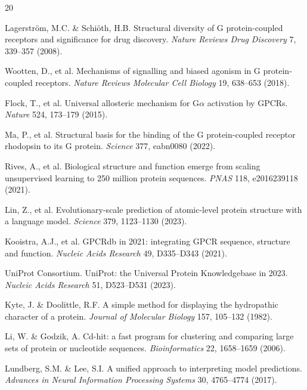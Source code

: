 \documentclass[11pt,a4paper]{article}
\begin{document}

\begin{thebibliography}{20}

Lagerstr\"om, M.C. \& Schi\"oth, H.B.
Structural diversity of G protein-coupled receptors and significance for drug discovery.
\textit{Nature Reviews Drug Discovery} 7, 339--357 (2008).

Wootten, D., et al.
Mechanisms of signalling and biased agonism in G protein-coupled receptors.
\textit{Nature Reviews Molecular Cell Biology} 19, 638--653 (2018).

Flock, T., et al.
Universal allosteric mechanism for G$\alpha$ activation by GPCRs.
\textit{Nature} 524, 173--179 (2015).

Ma, P., et al.
Structural basis for the binding of the G protein-coupled receptor rhodopsin to its G protein.
\textit{Science} 377, eabn0080 (2022).

Rives, A., et al.
Biological structure and function emerge from scaling unsupervised learning to 250 million protein sequences.
\textit{PNAS} 118, e2016239118 (2021).

Lin, Z., et al.
Evolutionary-scale prediction of atomic-level protein structure with a language model.
\textit{Science} 379, 1123--1130 (2023).

Kooistra, A.J., et al.
GPCRdb in 2021: integrating GPCR sequence, structure and function.
\textit{Nucleic Acids Research} 49, D335--D343 (2021).

UniProt Consortium.
UniProt: the Universal Protein Knowledgebase in 2023.
\textit{Nucleic Acids Research} 51, D523--D531 (2023).

Kyte, J. \& Doolittle, R.F.
A simple method for displaying the hydropathic character of a protein.
\textit{Journal of Molecular Biology} 157, 105--132 (1982).

Li, W. \& Godzik, A.
Cd-hit: a fast program for clustering and comparing large sets of protein or nucleotide sequences.
\textit{Bioinformatics} 22, 1658--1659 (2006).

Lundberg, S.M. \& Lee, S.I.
A unified approach to interpreting model predictions.
\textit{Advances in Neural Information Processing Systems} 30, 4765--4774 (2017).


\end{thebibliography}
\end{document}

